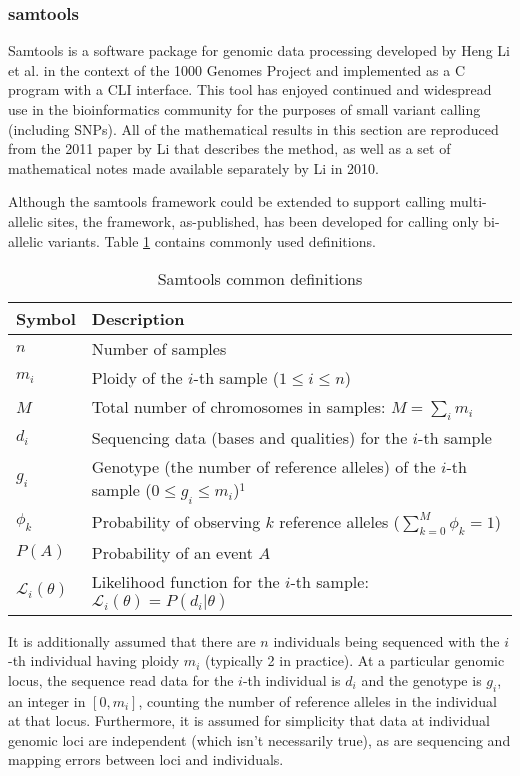 \subsubsection{samtools}
Samtools\autocite{li2009sequence} is a software package for genomic data processing developed by Heng Li et al. in the context of the 1000 Genomes Project\autocite{10002010map} and implemented as a C program with a CLI interface. This tool has enjoyed continued and widespread use in the bioinformatics community for the purposes of small variant calling (including SNPs). All of the mathematical results in this section are reproduced from the 2011 paper by Li\autocite{li2011statistical} that describes the method, as well as a set of mathematical notes made available separately by Li\autocite{li2010mathematical} in 2010.

Although the samtools framework could be extended to support calling multi-allelic sites, the framework, as-published, has been developed for calling only bi-allelic variants. Table \ref{tab:samtools_notation} contains commonly used definitions.

\begin{table}[!htb]
    \centering
    \caption{Samtools common definitions}
    \label{tab:samtools_notation}
    {\begin{tabular}{lp{7cm}}
    \toprule
    Symbol & Description \\
    \midrule
    $n$ & Number of samples \\
    $m_i$ & Ploidy of the $i$-th sample ($1\le i\le n$)\\
    $M$ & Total number of chromosomes in samples: $M=\sum_i m_i$\\
    $d_i$ & Sequencing data (bases and qualities) for the $i$-th sample\\
    $g_i$ & Genotype (the number of reference alleles) of the $i$-th sample \mbox{($0\le g_i\le m_i$)}$^1$\\
    $\phi_k$ & Probability of observing $k$ reference alleles ($\sum_{k=0}^M\phi_k=1$) \\
    $P(A)$ & Probability of an event $A$\\
    $\mathcal{L}_i(\theta)$ & Likelihood function for the $i$-th sample: $\mathcal{L}_i(\theta)=P(d_i|\theta)$ \\
    \bottomrule
    \end{tabular}}
\end{table}

It is additionally assumed that there are $n$ individuals being sequenced with the $i$-th individual having ploidy $m_i$ (typically 2 in practice). At a particular genomic locus, the sequence read data for the $i$-th individual is $d_i$ and the genotype is $g_i$, an integer in $[0,m_i]$, counting the number of reference alleles in the individual at that locus. Furthermore, it is assumed for simplicity that data at individual genomic loci are independent (which isn't necessarily true), as are sequencing and mapping errors between loci and individuals.

